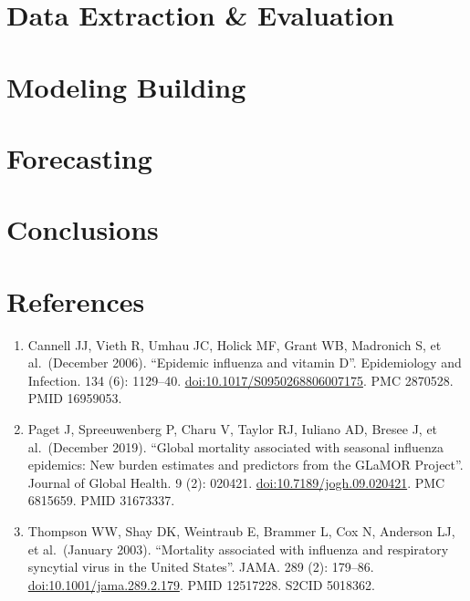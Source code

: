 \documentclass[
]{article}
\providecommand{\tightlist}{%
  \setlength{\itemsep}{0pt}\setlength{\parskip}{0pt}}
\begin{document}
\hypertarget{data-extraction-evaluation}{%
\section{Data Extraction \&
Evaluation}\label{data-extraction-evaluation}}

\newpage

\hypertarget{modeling-building}{%
\section{Modeling Building}\label{modeling-building}}

\newpage

\hypertarget{forecasting}{%
\section{Forecasting}\label{forecasting}}

\newpage

\hypertarget{conclusions}{%
\section{Conclusions}\label{conclusions}}

\newpage

\hypertarget{references}{%
\section{References}\label{references}}

\begin{enumerate}
\def\labelenumi{\arabic{enumi}.}
\tightlist
\item
  Cannell JJ, Vieth R, Umhau JC, Holick MF, Grant WB, Madronich S, et
  al.~(December 2006). ``Epidemic influenza and vitamin D''.
  Epidemiology and Infection. 134 (6): 1129--40.
  \url{doi:10.1017/S0950268806007175}. PMC 2870528. PMID 16959053.
\item
  Paget J, Spreeuwenberg P, Charu V, Taylor RJ, Iuliano AD, Bresee J, et
  al.~(December 2019). ``Global mortality associated with seasonal
  influenza epidemics: New burden estimates and predictors from the
  GLaMOR Project''. Journal of Global Health. 9 (2): 020421.
  \url{doi:10.7189/jogh.09.020421}. PMC 6815659. PMID 31673337.
\item
  Thompson WW, Shay DK, Weintraub E, Brammer L, Cox N, Anderson LJ, et
  al.~(January 2003). ``Mortality associated with influenza and
  respiratory syncytial virus in the United States''. JAMA. 289 (2):
  179--86. \url{doi:10.1001/jama.289.2.179}. PMID 12517228. S2CID
  5018362.
\end{enumerate}
\end{document}
